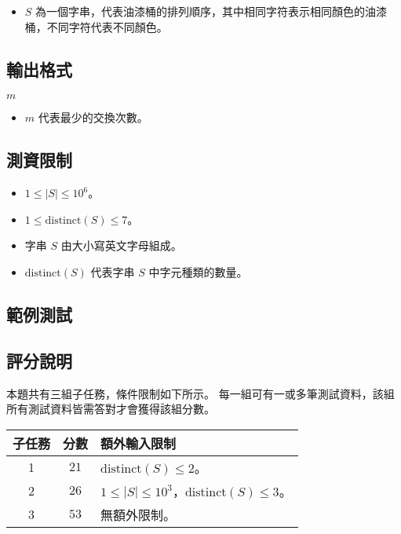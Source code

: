 \begin{itemize}
\tightlist
\item
  \(S\)
  為一個字串，代表油漆桶的排列順序，其中相同字符表示相同顏色的油漆桶，不同字符代表不同顏色。
\end{itemize}

\subsection{輸出格式}

\begin{format}
\f{
$m$
}
\end{format}

\begin{itemize}
\tightlist
\item
  \(m\) 代表最少的交換次數。
\end{itemize}

\subsection{測資限制}

\begin{itemize}
\tightlist
\item
  \(1 \le |S| \le {10}^{6}\)。
\item
  \(1 \le \textrm{distinct}(S) \le 7\)。
\item
  字串 \(S\) 由大小寫英文字母組成。
\item
  \(\textrm{distinct}(S)\) 代表字串 \(S\) 中字元種類的數量。
\end{itemize}

\subsection{範例測試}

\begin{example}
%
%
%
\end{example}

\subsection{評分說明}

本題共有三組子任務，條件限制如下所示。
每一組可有一或多筆測試資料，該組所有測試資料皆需答對才會獲得該組分數。

\begin{longtable}[]{@{}ccl@{}}
\toprule
子任務 & 分數 & 額外輸入限制 \\
\midrule
\endhead
1 & \(21\) & \(\textrm{distinct}(S) \le 2\)。 \\
2 & \(26\) &
\(1 \le |S| \le {10}^{3}\)，\(\textrm{distinct}(S) \le 3\)。 \\
3 & \(53\) & 無額外限制。 \\
\bottomrule
\end{longtable}

